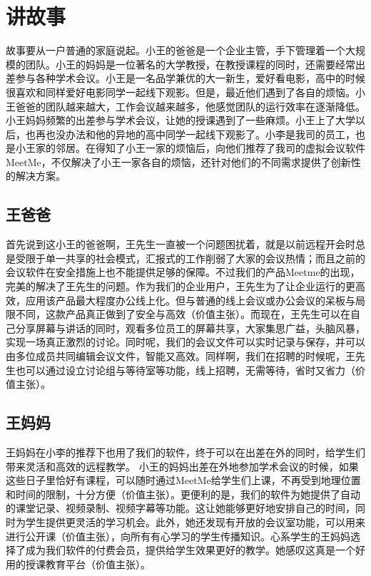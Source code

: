 \documentclass[a4paper,12pt]{article}
\begin{document}
    \section{讲故事}
    \noindent 故事要从一户普通的家庭说起。小王的爸爸是一个企业主管，手下管理着一个大规模的团队。小王的妈妈是一位著名的大学教授，在教授课程的同时，还需要经常出差参与各种学术会议。小王是一名品学兼优的大一新生，爱好看电影，高中的时候很喜欢和同样爱好电影同学一起线下观影。但是，最近他们遇到了各自的烦恼。小王爸爸的团队越来越大，工作会议越来越多，他感觉团队的运行效率在逐渐降低。小王妈妈频繁的出差参与学术会议，让她的授课遇到了一些麻烦。小王上了大学以后，也再也没办法和他的异地的高中同学一起线下观影了。小李是我司的员工，也是小王家的邻居。在得知了小王一家的烦恼后，向他们推荐了我司的虚拟会议软件MeetMe，不仅解决了小王一家各自的烦恼，还针对他们的不同需求提供了创新性的解决方案。
    
    \subsection{王爸爸}
    \noindent 首先说到这小王的爸爸啊，王先生一直被一个问题困扰着，就是以前远程开会时总是受限于单一共享的社会模式，汇报式的工作削弱了大家的会议热情；而且之前的会议软件在安全措施上也不能提供足够的保障。不过我们的产品Meetme的出现，完美的解决了王先生的问题。作为我们的企业用户，王先生为了让企业运行的更高效，应用该产品最大程度办公线上化。但与普通的线上会议或办公会议的呆板与局限不同，这款产品真正做到了安全与高效（价值主张）。而现在，王先生可以在自己分享屏幕与讲话的同时，观看多位员工的屏幕共享，大家集思广益，头脑风暴，实现一场真正激烈的讨论。同时呢，我们的会议文件可以实时记录与保存，并可以由多位成员共同编辑会议文件，智能又高效。同样啊，我们在招聘的时候呢，王先生也可以通过设立讨论组与等待室等功能，线上招聘，无需等待，省时又省力（价值主张）。
    
    \subsection{王妈妈}
    \noindent 
    王妈妈在小李的推荐下也用了我们的软件，终于可以在出差在外的同时，给学生们带来灵活和高效的远程教学。
    小王的妈妈出差在外地参加学术会议的时候，如果这些日子里恰好有课程，可以随时通过MeetMe给学生们上课，不再受到地理位置和时间的限制，十分方便（价值主张）。更便利的是，我们的软件为她提供了自动的课堂记录、视频录制、视频字幕等功能。这让她能够更好地安排自己的时间，同时为学生提供更灵活的学习机会。此外，她还发现有开放的会议室功能，可以用来进行公开课（价值主张），向所有有心学习的学生传播知识。心系学生的王妈妈选择了成为我们软件的付费会员，提供给学生效果更好的教学。她感叹这真是一个好用的授课教育平台（价值主张）。
    
\end{document}
